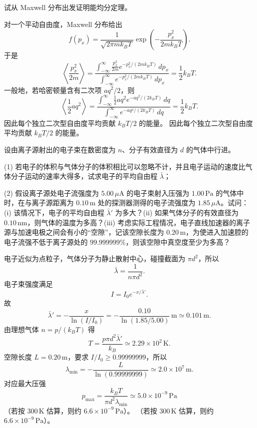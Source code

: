 \begin{question}
试从 Maxwell 分布出发证明能均分定理。
\begin{solution}
对一个平动自由度，Maxwell 分布给出
\[
f(p_x)=\frac1{\sqrt{2\pi mk_BT}}\exp\left(-\frac{p_x^2}{2mk_BT}\right).
\]
于是
\[
\left\langle \frac{p_x^2}{2m}\right\rangle
=\frac{\int_{-\infty}^{\infty}\frac{p_x^2}{2m}e^{-p_x^2/(2mk_BT)}\,dp_x}{\int_{-\infty}^{\infty}e^{-p_x^2/(2mk_BT)}\,dp_x}
=\frac12k_BT.
\]
一般地，若哈密顿量含有二次项 $a q^2/2$，则
\[
\left\langle \frac12a q^2\right\rangle
=\frac{\int_{-\infty}^{\infty}\frac12a q^2 e^{-aq^2/(2k_BT)}\,dq}{\int_{-\infty}^{\infty}e^{-aq^2/(2k_BT)}\,dq}
=\frac12k_BT.
\]
因此每个独立二次型自由度平均贡献 $k_BT/2$ 的能量。
因此每个独立二次型自由度平均贡献 $k_BT/2$ 的能量。
\end{solution}
\end{question}

\begin{question}
设由离子源射出的电子束在数密度为 $n$、分子有效直径为 $d$ 的气体中行进。

(1) 若电子的体积与气体分子的体积相比可以忽略不计，并且电子运动的速度比气体分子运动的速率大得多，试求电子的平均自由程 $\bar\lambda$；

(2) 假设离子源处电子流强度为 $5.00\,\mu\mathrm A$ 的电子束射入压强为 $1.00\,\mathrm{Pa}$ 的气体中时，在与离子源距离为 $0.10\,\mathrm m$ 处的探测器测得的电子流强度为 $1.85\,\mu\mathrm A$。试问：(i) 该情况下，电子的平均自由程 $\bar\lambda'$ 为多大？(ii) 如果气体分子的有效直径为 $0.10\,\mathrm{nm}$，则气体的温度为多高？(iii) 考虑实际工程情况，电子直线加速器的离子源与加速电极之间会有小的“空隙”，记该空隙长度为 $0.20\,\mathrm m$，为使进入加速腔的电子流强不低于离子源处的 $99.999999\%$，则该空隙中真空度至少为多高？
\begin{solution}
电子近似为点粒子，气体分子为静止散射中心，碰撞截面为 $\pi d^2$，所以
\[
\bar\lambda=\frac1{n\pi d^2}.
\]
电子束强度满足
\[
I=I_0e^{-x/\bar\lambda'}.
\]
故
\[
\bar\lambda'=-\frac{x}{\ln(I/I_0)}
=-\frac{0.10}{\ln(1.85/5.00)}\,\mathrm m
\simeq0.101\,\mathrm m.
\]
由理想气体 $n=p/(k_BT)$ 得
\[
T=\frac{p\pi d^2\bar\lambda'}{k_B}
\simeq2.29\times10^2\,\mathrm K.
\]
空隙长度 $L=0.20\,\mathrm m$，要求 $I/I_0\ge0.99999999$，所以
\[
\lambda_{\min}=-\frac{L}{\ln(0.99999999)}\simeq2.0\times10^7\,\mathrm m.
\]
对应最大压强
\[
p_{\max}=\frac{k_BT}{\pi d^2\lambda_{\min}}
\simeq5.0\times10^{-9}\,\mathrm{Pa}
\]
（若按 $300\,\mathrm K$ 估算，则约 $6.6\times10^{-9}\,\mathrm{Pa}$）。
（若按 $300\,\mathrm K$ 估算，则约 $6.6\times10^{-9}\,\mathrm{Pa}$）。
\end{solution}
\end{question}

